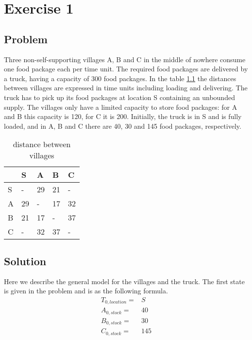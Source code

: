 \chapter{Exercise 1}

\section{Problem}
Three non-self-supporting villages A, B and C in the middle of nowhere consume one food package each per time unit. The required food packages are delivered by a truck, having a capacity of 300 food packages. In the table \ref{table:villagesdistance} the distances between villages are expressed in time units including loading and delivering. The truck has to pick up its food packages at location S containing an unbounded supply. The villages only have a limited capacity to store food packages: for A and B this capacity is 120, for C it is 200. Initially, the truck is in S and is fully loaded, and in A, B and C there are 40, 30 and 145 food packages, respectively.

\begin{table}[]
	\centering
	\caption{distance between villages}
	\label{table:villagesdistance}
	\begin{tabular}{@{}lllll@{}}
		\toprule
		& S  & A  & B  & C  \\ \midrule
		S & -  & 29 & 21 & -  \\
		A & 29 & -  & 17 & 32 \\
		B & 21 & 17 & -  & 37 \\
		C & -  & 32 & 37 & -  \\ \bottomrule
	\end{tabular}
\end{table}

\section{Solution}

Here we describe the general model for the villages and the truck. The first state is given in the problem and is as the following formula.
\begin{align*}
T_{0,location} =& S \\
A_{0,stock} =& 40 \\
B_{0,stock} =& 30 \\
C_{0,stock} =& 145 \\
\end{align*}

